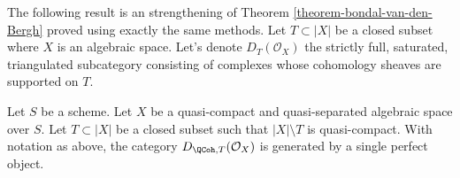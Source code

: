 \noindent
The following result is an strengthening of
Theorem \ref{theorem-bondal-van-den-Bergh}
proved using exactly the same methods.
Let $T \subset |X|$ be a closed subset where $X$ is an algebraic space.
Let's denote $D_T(\mathcal{O}_X)$ the strictly full, saturated,
triangulated subcategory consisting of complexes whose
cohomology sheaves are supported on $T$.

\begin{lemma}
\label{lemma-generator-with-support}
Let $S$ be a scheme. Let $X$ be a quasi-compact and quasi-separated
algebraic space over $S$. Let $T \subset |X|$ be a
closed subset such that $|X| \setminus T$ is quasi-compact. With notation
as above, the category $D_{\QCoh, T}(\mathcal{O}_X)$ is generated by a
single perfect object.
\end{lemma}

